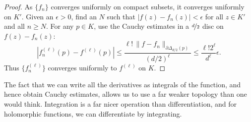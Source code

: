 \documentclass[12pt,openany]{book}
\newcommand{\sabs}[1]{\lvert {#1} \rvert}
\newcommand{\snorm}[1]{\lVert {#1} \rVert}
\newcommand{\abs}[1]{\left\lvert {#1} \right\rvert}
\theoremstyle{plain}
\theoremstyle{remark}
\theoremstyle{definition}
\theoremstyle{exercise}
\theoremstyle{example}
\begin{document}
\begin{proof}
As $\{ f_n \}$ converges uniformly on compact subsets, it converges uniformly
on $K'$.  Given an $\epsilon > 0$, find an $N$ such that 
$\sabs{f(z)-f_n(z)} < \epsilon$ for all $z \in K'$ and
all $n \geq N$.
For any $p \in K$, use the Cauchy estimates in a $\nicefrac{d}{2}$ disc
on $f(z)-f_n(z)$:
\begin{equation*}
\abs{
f_n^{(\ell)}(p)
-
f^{(\ell)}(p)
}
\leq
\frac{\ell! \, \snorm{f-f_n}_{\partial \Delta_{d/2}(p)}}{{(d/2)}^{\ell}}
\leq
\frac{\ell!2^\ell}{d^\ell}\epsilon .
\end{equation*}
Thus $\bigl\{ f_n^{(\ell)} \bigr\}$ converges uniformly to $f^{(\ell)}$ on $K$.
\end{proof}

The fact that we can write all the derivatives as
integrals of the function, and hence obtain Cauchy estimates,
allows us to use a far weaker topology than one would think.
Integration is a far nicer operation than differentiation, and for
holomorphic functions, we can differentiate by integrating.
\end{document}
